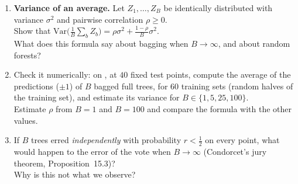 \documentclass[a4paper,11pt]{article}
\begin{document}
\begin{enumerate}
\item \textbf{Variance of an average.} Let $Z_1,\dots,Z_B$ be identically distributed with variance $\sigma^2$ and
      pairwise correlation $\rho\geq0$.\\
      Show that $\mathrm{Var}\big(\frac1B\sum_bZ_b\big)=\rho\sigma^2+\frac{1-\rho}{B}\sigma^2$.\\
      What does this formula say about bagging when $B\to\infty$, and about random forests?
\item Check it numerically: on , at $40$ fixed test points, compute the average of the predictions ($\pm1$) of
      $B$ bagged full trees, for $60$ training sets (random halves of the training set), and estimate its variance for
      $B\in\{1,5,25,100\}$.\\
      Estimate $\rho$ from $B=1$ and $B=100$ and compare the formula with the other values.
\item If $B$ trees erred \emph{independently} with probability $r<\frac12$ on every point, what would happen to the error
      of the vote when $B\to\infty$ (Condorcet's jury theorem, Proposition~15.3)?\\
      Why is this not what we observe?
\end{enumerate}
\end{document}
